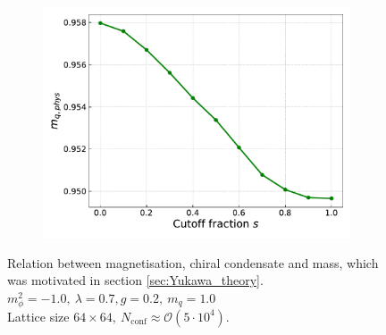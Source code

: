 \begin{figure}
\begin{subfigure}[b]{0.48\textwidth}
        \includegraphics[width=1.0\textwidth]{figures/slide_broken/mass.pdf}
    \end{subfigure}
    \caption[Relation between magnetisation, condensate and mass]{Relation between magnetisation, chiral condensate and mass, which was motivated in section \ref{sec:Yukawa_theory}. \\ $m_\phi^2=-1.0, \ \lambda=0.7, g=0.2, \ m_q = 1.0$ \\ Lattice size $64 \times 64, \ N_\text{conf} \approx \mathcal{O}(5 \cdot 10^4)$.}
    \label{fig:interpolation_relation_phi_cond_mass}
\end{figure}
\newpage


